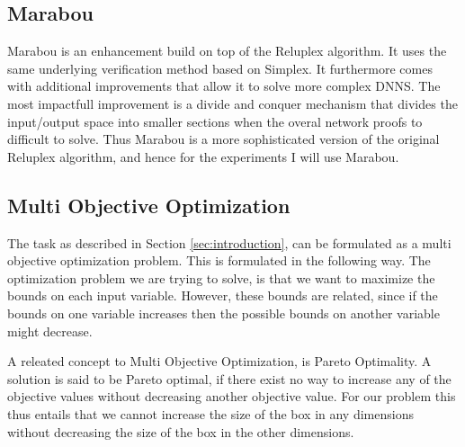 \documentclass[../main.tex]{subfiles}
\begin{document}
\subsection*{Marabou}
Marabou is an enhancement build on top of the Reluplex algorithm. It uses the same underlying verification method based on Simplex. It furthermore comes with additional improvements that allow it to solve more complex DNNS. The most impactfull improvement is a divide and conquer mechanism that divides the input/output space into smaller sections when the overal network proofs to difficult to solve. Thus Marabou is a more sophisticated version of the original Reluplex algorithm, and hence for the experiments I will use Marabou.\cite{katzMarabouFrameworkVerification2019}

\subsection*{Multi Objective Optimization}
The task as described in Section \ref{sec:introduction}, can be formulated as a multi objective optimization problem. This is formulated in the following way. The optimization problem we are trying to solve, is that we want to maximize the bounds on each input variable. However, these bounds are related, since if the bounds on one variable increases then the possible bounds on another variable might decrease. 

A releated concept to Multi Objective Optimization, is Pareto Optimality. A solution is said to be Pareto optimal, if there exist no way to increase any of the objective values without decreasing another objective value\cite{stiglitzParetoOptimalityCompetition1981}. For our problem this thus entails that we cannot increase the size of the box in any dimensions without decreasing the size of the box in the other dimensions. 
\end{document}
